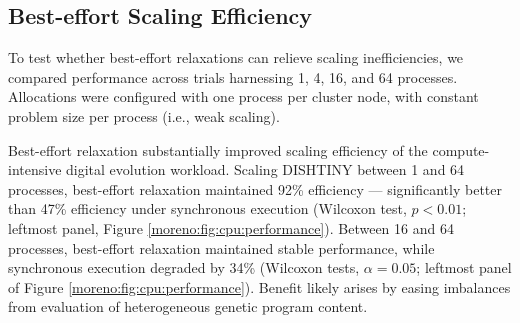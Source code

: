 
\subsection{Best-effort Scaling Efficiency}
\label{moreno:sec:case1:scaling-efficiency}

To test whether best-effort relaxations can relieve scaling inefficiencies, we compared performance across trials harnessing 1, 4, 16, and 64 processes.
Allocations were configured with one process per cluster node, with constant problem size per process (i.e., weak scaling).


Best-effort relaxation substantially improved scaling efficiency of the compute-intensive digital evolution workload.
Scaling DISHTINY between 1 and 64 processes, best-effort relaxation maintained 92\% efficiency --- significantly better than 47\% efficiency under synchronous execution (Wilcoxon test, $p<0.01$; leftmost panel, Figure \ref{moreno:fig:cpu:performance}).
Between 16 and 64 processes, best-effort relaxation maintained stable performance, while synchronous execution degraded by 34\% (Wilcoxon tests, $\alpha = 0.05$; leftmost panel of Figure \ref{moreno:fig:cpu:performance}).
Benefit likely arises by easing imbalances from evaluation of heterogeneous genetic program content.

